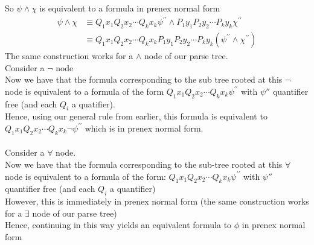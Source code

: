 \documentclass{article}[18pt]
\begin{document}
So $\psi\land \chi$ is equivalent to a formula in prenex normal form
$$\begin{aligned} \psi \wedge \chi & \equiv Q _ { 1 } x _ { 1 } Q _ { 2 } x _ { 2 } \cdots Q _ { k } x _ { k } \psi ^ { \prime \prime } \wedge P _ { 1 } y _ { 1 } P _ { 2 } y _ { 2 } \cdots P _ { k } y _ { k } \chi ^ { \prime \prime } \\ & \equiv Q _ { 1 } x _ { 1 } Q _ { 2 } x _ { 2 } \cdots Q _ { k } x _ { k } P _ { 1 } y _ { 1 } P _ { 2 } y _ { 2 } \cdots P _ { k } y _ { k } \left( \psi ^ { \prime \prime } \wedge \chi ^ { \prime \prime } \right) \end{aligned}$$
The same construction works for a $\land$ node of our parse tree.\\
Consider a $\lnot$ node\\
Now we have that the formula corresponding to the sub tree rooted at this $\lnot$ node is equivalent to a formula of the form $Q _ { 1 } x _ { 1 } Q _ { 2 } x _ { 2 } \cdots Q _ { k } x _ { k } \psi ^ { \prime \prime }$ with $\psi''$ quantifier free (and each $Q_i$ a quatifier).\\
Hence, using our general rule from earlier, this formula is equivalent to $Q _ { 1 } x _ { 1 } Q _ { 2 } x _ { 2 } \cdots Q _ { k } x _ { k } \neg \psi ^ { \prime \prime }$ which is in prenex normal form.\\
\\
Consider a $\forall$ node.\\
Now we have that the formula corresponding to the sub-tree rooted at this $\forall$ node is equivalent to a formula of the form: $Q _ { 1 } x _ { 1 } Q _ { 2 } x _ { 2 } \cdots Q _ { k } x _ { k } \psi ^ { \prime \prime }$ with $\psi''$ quantifier free (and each $Q_i$ a quantifier)\\
However, this is immediately in prenex normal form (the same construction works for a $\exists$ node of our parse tree)\\
Hence, continuing in this way yields an equivalent formula to $\phi$ in prenex normal form
\end{document}
